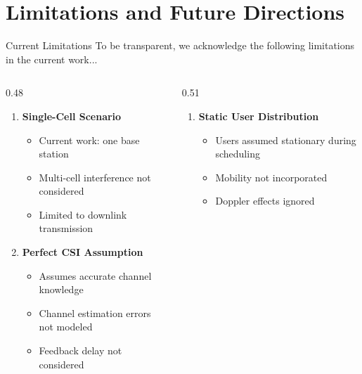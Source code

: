 \documentclass[aspectratio=169]{beamer}
\begin{document}
\section{Limitations and Future Directions}

\begin{frame}{Current Limitations}
    \vspace{-0.3cm}
    \small \textcolor{iiitblue}{To be transparent, we acknowledge the following limitations in the current work...}
    
    \vspace{0.1cm}
    
    \begin{columns}[T]
        \begin{column}{0.48\textwidth}
            \begin{enumerate}\itemsep0.2em
                \item \textbf{Single-Cell Scenario}
                \begin{itemize}\itemsep0.05em
                    \item Current work: one base station
                    \item Multi-cell interference not considered
                    \item Limited to downlink transmission
                \end{itemize}
                
                \vspace{0.15cm}
                
                \item \textbf{Perfect CSI Assumption}
                \begin{itemize}\itemsep0.05em
                    \item Assumes accurate channel knowledge
                    \item Channel estimation errors not modeled
                    \item Feedback delay not considered
                \end{itemize}
            \end{enumerate}
        \end{column}
        \begin{column}{0.51\textwidth}
            \begin{enumerate}\itemsep0.2em
                \setcounter{enumi}{2}
                \item \textbf{Static User Distribution}
                \begin{itemize}\itemsep0.05em
                    \item Users assumed stationary during scheduling
                    \item Mobility not incorporated
                    \item Doppler effects ignored
                \end{itemize}
                

\end{enumerate}
\end{column}
\end{columns}
\end{frame}
\end{document}
